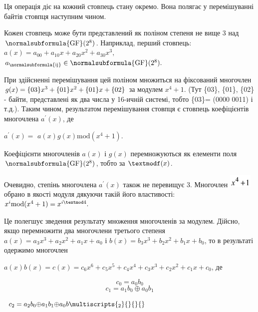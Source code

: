 \bigskip

Ця операція діє на кожний стовпець стану окремо. Вона полягає у перемішуванні
байтів стовпця наступним чином.

Кожен стовпець може бути представлений як поліном степеня не вище 3 над 
$\normalsubformula{\text{GF}}(2^8)$. Наприклад, перший стовпець:\ \ 
$a(x)=a_{\text{00}}+a_{\text{10}}x+a_{\text{20}}x^{2}+a_{\text{30}}x^3,$
 ${a_{\normalsubformula{\text{ij}}}\in
\normalsubformula{\text{GF}}(2^{8})\text{.}}$  


\bigskip

При  здійсненні перемішування цей поліном множиться на фіксований многочлен 
$g(x)=\{\text{03}\}x^{3}+\{\text{01}\}x^{2}+\{\text{01}\}x+\{\text02\}$
за модулем  $x^4+1$. (Тут \{03\}, \{01\}, \{02\} -  байти, представлені
як два числа у 16-ичній системі, тобто \{03\}= (0000 0011) і т.д.). Таким
чином, результатом перемішування стовпця є стовпець коефіцієнтів многочлена 
$a^{'}(x)$, де

\begin{figure}
\centering
\begin{minipage}{1.4965in}
{\centering   [Warning: Image ignored] %
 \par}
\end{minipage}
\end{figure}
{\centering
 ${a}^{'}(x)=$ $a(x)g(x)\text{mod}(x^4+1)$.
\par}

Коефіцієнти многочленів  $a(x)$ і  $g(x)$ перемножуються як елементи поля 
$\normalsubformula{\text{GF}}(2^{8})$, тобто за  $\textmodf(x)$.

Очевидно, степінь многочлена  $a^{'}(x)$ також не перевищує 3. Многочлен 
\includegraphics[width=0.4307in,height=0.25in]{crypt-img/crypt-img334.png} 
обрано в якості модуля дякуючи такій його властивості: 
$x^{i}\text{mod}(x^{4}+1)=x^{i\textmod4}\text{.}$

Це полегшує зведення результату множення многочленів за модулем. Дійсно, якщо
перемножити два многочлени третього степеня 
$a(x)=a_{3}x^{3}+a_{2}x^{2}+a_{1}x+a_0$ і 
$b(x)=b_{3}x^{3}+b_{2}x^{2}+b_{1}x+b_0$, то в результаті
одержимо многочлен 


$a(x)b(x)=c(x)=c_{6}x^{6}+c_{5}x^{5}+c_{4}x^{4}+c_{3}x^{3}+c_{2}x^{2}+c_{1}x+c_0$,
де 

\begin{equation*}
{c_{0}=a_{0}b_{0}}
\end{equation*}
\begin{equation*}
{c_{1}=a_{1}b_{0}{\oplus}a_{0}b_{1}}
\end{equation*}
{\centering  $ $
$c_{2}=a_{2}b_{0}{\oplus}a_{1}b_{1}{\oplus}a_{0}b\multiscripts{_{2}}{}{}{\text{}}$\par}

